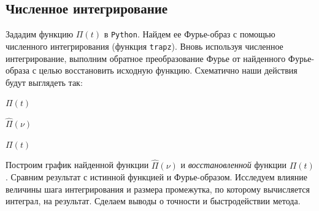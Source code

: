 \documentclass[a4paper, 12pt]{article}
\begin{document}
    \subsection{Численное интегрирование}
    Зададим функцию $\Pi(t)$ в \texttt{Python}. Найдем ее Фурье-образ с помощью численного интегрирования (функция \texttt{trapz}).
    Вновь используя численное интегрирование, выполним обратное преобразование Фурье от найденного Фурье-образа с целью восстановить исходную функцию.
    Схематично наши действия будут выглядеть так:
    \begin{center}
        $\Pi(t)$
        $\hat{\Pi}(\nu)$
        $\Pi(t)$
    \end{center}
    Построим график найденной функции $\hat{\Pi}(\nu)$ и \textit{восстановленной} функции $\Pi(t)$.
    Сравним результат с истинной функцией и Фурье-образом. Исследуем влияние
    величины шага интегрирования и размера промежутка, по которому вычисляется
    интеграл, на результат. Сделаем выводы о точности и быстродействии метода.
\end{document}
